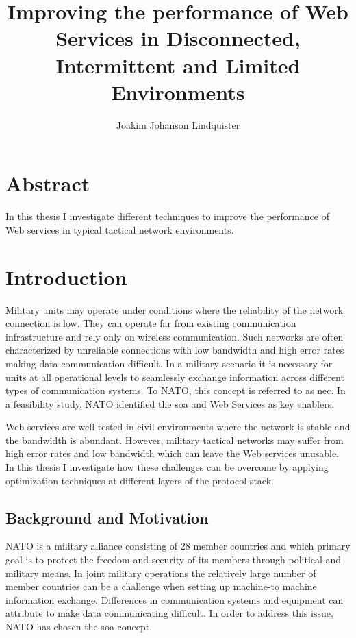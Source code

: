 \documentclass[USenglish]{ifimaster}
\title{Improving the performance of Web Services in Disconnected, Intermittent
and Limited Environments}
\author{Joakim Johanson Lindquister}
\begin{document}
\ififorside{}

\chapter*{Abstract}
In this thesis I investigate different techniques to improve the performance of
Web services in typical tactical network environments.
\pagebreak

\tableofcontents
\listoftables
\listoffigures

\pagebreak


\chapter{Introduction}
Military units may operate under conditions where the reliability of the network
connection is low. They can operate far from existing communication
infrastructure and rely only on wireless communication. Such networks are often
characterized by unreliable connections with low bandwidth and high error rates
making data communication difficult. In a military scenario it is necessary for
units at all operational levels to seamlessly exchange information across
different types of communication systems. To NATO, this concept is referred to
as \gls{nec}. In a feasibility study, NATO identified the \gls{soa} and Web
Services as key enablers\cite{nnec-study}.

Web services are well tested in civil environments where the network is stable
and the bandwidth is abundant. However, military tactical networks may suffer
from high error rates and low bandwidth which can leave the Web services
unusable. In this thesis I investigate how these challenges can be overcome by applying optimization techniques at different layers of the protocol stack.

\section{Background and Motivation}
NATO is a military alliance consisting of 28 member
countries\cite{nato-homepage-member-countries} and which primary goal is to
protect the freedom and security of its members through political and military
means. In joint military operations the relatively large number of member
countries can be a challenge when setting up machine-to machine information
exchange. Differences in communication systems and equipment can attribute to
make data communicating difficult. In order to address this issue, NATO has
chosen the \gls{soa} concept\cite{IST-090}.
\end{document}
